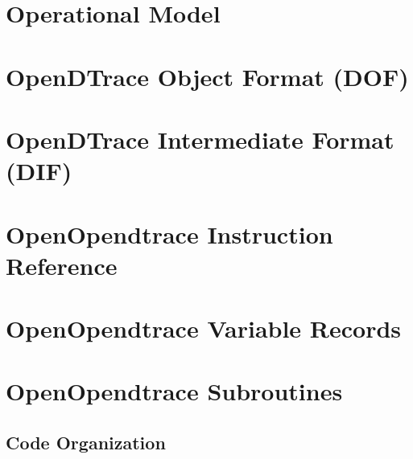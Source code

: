 \chapter{Operational Model}
\label{chap:operation}


\chapter{OpenDTrace Object Format (DOF)}
\label{chap:opendtrace-object-format}


\chapter{OpenDTrace Intermediate Format (DIF)}
\label{chap:opendtrace-intermediate-format}


\chapter{OpenOpendtrace Instruction Reference}
\label{chap:opendtrace-instruction-reference}


\chapter{OpenOpendtrace Variable Records}
\label{chap:opendtrace-variable-records}


\chapter{OpenOpendtrace Subroutines}
\label{chap:opendtrace-subroutines}


\begin{appendices}
\chapter{Code Organization}
\label{chap:opendtrace-code}


\end{appendices}






